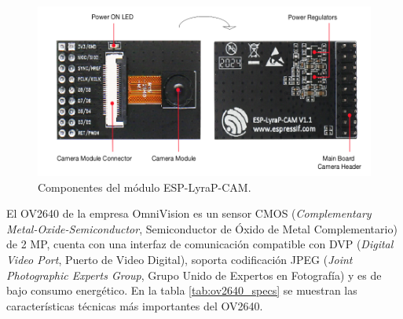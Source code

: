 \begin{figure}[h]
	\centering
	\includegraphics[scale=0.5]{./Figures/camera_blocks.png}
	\caption{Componentes del módulo ESP-LyraP-CAM\protect\footnotemark.}
	\label{fig:camera_comp}
\end{figure}

El OV2640 de la empresa OmniVision es un sensor CMOS (\textit{Complementary Metal-Oxide-Semiconductor}, Semiconductor de Óxido de Metal Complementario) de 2 MP, cuenta con una interfaz de comunicación compatible con DVP  (\textit{Digital Video Port}, Puerto de Video Digital), soporta codificación JPEG (\textit{Joint Photographic Experts Group}, Grupo Unido de Expertos en Fotografía) y es de bajo consumo energético. En la tabla \ref{tab:ov2640_specs} se muestran las características técnicas más importantes del OV2640.

